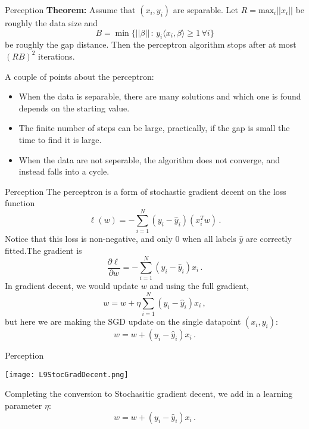 \documentclass[10pt, table, dvipsnames,xcdraw, handout]{beamer}
\begin{document}
\begin{frame}[fragile]{Perception}
\textbf{Theorem:} Assume that $(x_i,y_i)$ are separable. Let $R = \text{max}_i||x_i||$ be roughly the data size and
$$
B = \min\{||\beta||\,:\,y_i\langle  x_i,\beta\rangle\geq 1\,\forall i\}
$$
be roughly the gap distance. Then the perceptron algorithm stops after at most $(RB)^2$ iterations. \pause

A couple of points about the perceptron:
\begin{itemize}
\item[] When the data is separable, there are many solutions and which one is found depends on the starting value. \pause
\item[] The finite number of steps can be large, practically, if the gap is small the time to find it is large. \pause
\item[] When the data are not seperable, the algorithm does not converge, and instead falls into a cycle. 
\end{itemize}
\end{frame}




\begin{frame}[fragile]{Perception}
The perceptron is a form of stochastic gradient decent on the loss function
$$
\ell(w) = -\sum_{i=1}^N (y_i-\hat{y}_i)(x_i^Tw)\,.
$$
Notice that this loss is non-negative, and only 0 when all labels $\hat{y}$ are correctly fitted.\pause The gradient is
$$
\frac{\partial\ell}{\partial w} = -\sum_{i=1}^N (y_i-\hat{y}_i) x_i\,.
$$\pause
In gradient decent, we would update $w$ and using the full gradient,
$$
w = w + \eta \sum_{i=1}^N (y_i-\hat{y}_i) x_i\,,
$$
but here we are making the SGD update on the single datapoint $(x_i, y_i)$:
$$
w = w +  (y_i-\hat{y}_i) x_i\,.
$$
\end{frame}



\begin{frame}[fragile]{Perception}
  \begin{minipage}[t][0.5\textheight][t]{\textwidth}
	\centering \texttt{[image: L9StocGradDecent.png]} 
  \end{minipage}
  \vfill
\begin{minipage}[t][0.5\textheight][t]{\textwidth}
Completing the conversion to Stochasitic gradient decent, we add in a learning parameter $\eta$:
$$
w = w +  (y_i-\hat{y}_i) x_i\,.
$$
\end{minipage}
\end{frame}
\end{document}
